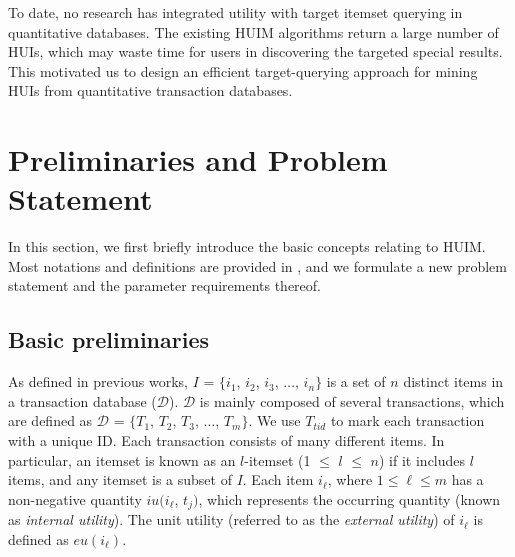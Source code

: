 \documentclass[journal]{IEEEtran}
\begin{document}
To date, no research has integrated utility with target itemset querying in quantitative databases. The existing HUIM algorithms return a large number of HUIs, which may waste time for users in discovering the targeted special results. This motivated us to design an efficient target-querying approach for mining HUIs from quantitative transaction databases.



\section{Preliminaries and Problem Statement}
\label{sec:preliminaries}

In this section, we first briefly introduce the basic concepts relating to HUIM. Most notations and definitions are provided in \cite{liu2012mining,lin2016fhn}, and we formulate a new problem statement and the parameter requirements thereof.


\subsection{Basic preliminaries}

As defined in previous works, $I$ = $\{i_1$, $i_2$, $i_3$, $\ldots$, $i_n\}$ is a set of $n$ distinct items in a transaction database ($\mathcal{D}$). $\mathcal{D}$ is mainly composed of several transactions, which are defined as $\mathcal{D}$ = $\{T_1$, $T_2$, $T_3$, $\ldots$, $T_m\}$. We use $T_{tid}$ to mark each transaction with a unique ID. Each transaction consists of many different items. In particular, an itemset is known as an $l$-itemset (1 $\le$ $l$ $\le$ $n$) if it includes $l$ items, and any itemset is a subset of $I$. Each item $i_{\ell}$, where $1 \leq \ell \leq m$ has a non-negative quantity $iu(i_{\ell}$, $t_j)$, which represents the occurring quantity (known as \textit{internal utility}). The unit utility (referred to as the \textit{external utility}) of $i_{\ell}$ is defined as $eu(i_{\ell})$.
\end{document}
